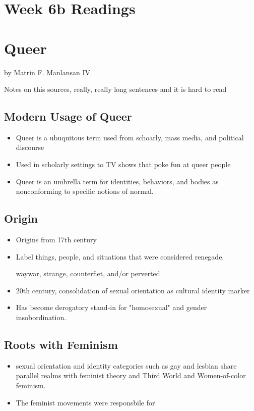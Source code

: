 \documentclass{article}
\begin{document}
  \section*{Week 6b Readings}

  \section{Queer}
  by Matrin F. Manlansan IV

  Notes on this sources, really, really long sentences and
  it is hard to read

  \subsection{Modern Usage of Queer}
  \begin{itemize}
    \item Queer is a ubuquitous term used from schoarly, mass media, and political discourse
    \item Used in scholarly settings to TV shows that poke fun at queer people
    \item Queer is an umbrella term for identities, behaviors, and bodies
      as nonconforming to specific notions of normal.
  \end{itemize}

  \subsection{Origin}
  \begin{itemize}
    \item Origins from 17th century
    \item Label things, people, and situations that were considered renegade,

      waywar, strange, counterfiet, and/or perverted
    \item 20th century, consolidation of sexual orientation as
      cultural identity marker
    \item Has become derogatory stand-in for "homosexual" and gender insobordination.
  \end{itemize}

  \subsection{Roots with Feminism}
  \begin{itemize}
    \item sexual orientation and identity categories such as gay and lesbian share
      parallel realms with feminist theory
      and Third World and Women-of-color feminism.
    \item The feminist movements were responsbile for
  \end{itemize}
\end{document}
